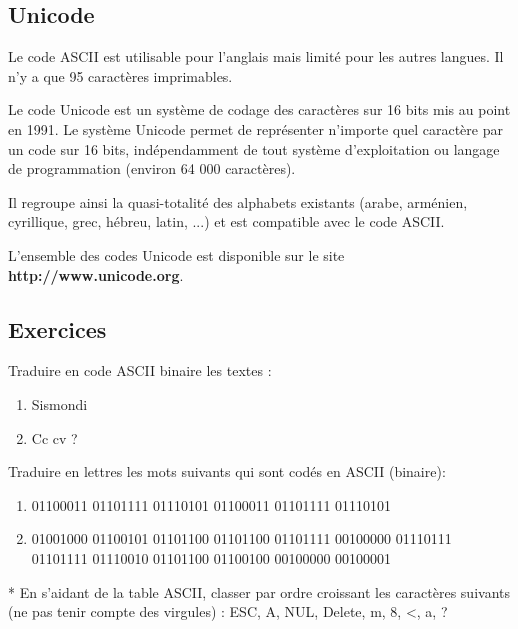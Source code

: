 \documentclass[11pt, a4paper]{book}
\begin{document}
\subsection{Unicode}

Le code ASCII est utilisable pour l'anglais mais limité pour les autres langues. Il n'y a que 95 caractères imprimables.

Le code Unicode est un système de codage des caractères sur 16 bits mis au point en 1991. Le système Unicode permet de représenter n'importe quel caractère par un code sur 16 bits, indépendamment de tout système d'exploitation ou langage de programmation (environ 64 000 caractères).

Il regroupe ainsi la quasi-totalité des alphabets existants (arabe, arménien, cyrillique, grec, hébreu, latin, ...) et est compatible avec le code ASCII.

L'ensemble des codes Unicode est disponible sur le site {\bf http://www.unicode.org}.


\subsection{Exercices}
\begin{exercice}
Traduire en code ASCII binaire les textes :
\begin{multicols}{2}
\begin{enumerate}
\item { Sismondi}
\item { Cc cv ?}
\end{enumerate}
\end{multicols}
\end{exercice}

\begin{exercice}
Traduire en lettres les mots suivants qui sont codés en ASCII (binaire):
\begin{enumerate}
\item 01100011 01101111 01110101 01100011 01101111 01110101
\item 01001000 01100101 01101100 01101100 01101111 00100000 01110111 01101111 01110010 01101100 01100100 00100000 00100001
\end{enumerate}
\end{exercice}

\begin{exercice}
* En s’aidant de la table ASCII, classer par ordre croissant les caractères suivants (ne pas tenir compte des virgules) : ESC, A, NUL, Delete, m, 8, <, a, ?
\end{exercice}
\end{document}
